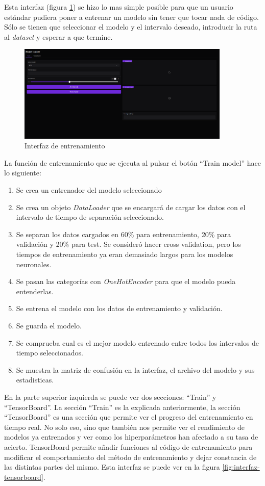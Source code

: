 Esta interfaz (figura \ref{fig:interfaz-train}) se hizo lo mas simple posible para que un usuario estándar pudiera poner a entrenar un modelo sin tener que tocar nada de código. Sólo se tienen que seleccionar el modelo y el intervalo deseado, introducir la ruta al \textit{dataset} y esperar a que termine.
\begin{figure}[H]
    \centering
    \includegraphics[width=0.9\textwidth]{Imagenes/Bitmap/interfaz-train.png}
    \caption{Interfaz de entrenamiento}
    \label{fig:interfaz-train}
\end{figure}


La función de entrenamiento que se ejecuta al pulsar el botón ``Train model'' hace lo siguiente:
\begin{enumerate}
    \item Se crea un entrenador del modelo seleccionado
    \item Se crea un objeto \textit{DataLoader} que se encargará de cargar los datos con el intervalo de tiempo de separación seleccionado.
    \item Se separan los datos cargados en 60\% para entrenamiento, 20\% para validación y 20\% para test. Se consideró hacer cross validation, pero los tiempos de entrenamiento ya eran demasiado largos para los modelos neuronales.
    \item Se pasan las categorías con \textit{OneHotEncoder} para que el modelo pueda entenderlas.
    \item Se entrena el modelo con los datos de entrenamiento y validación.
    \item Se guarda el modelo.
    \item Se comprueba cual es el mejor modelo entrenado entre todos los intervalos de tiempo seleccionados.
    \item Se muestra la matriz de confusión en la interfaz, el archivo del modelo y sus estadisticas.
\end{enumerate}

En la parte superior izquierda se puede ver dos secciones: ``Train'' y ``TensorBoard''. La sección ``Train'' es la explicada anteriormente, la sección ``TensorBoard'' es una sección que permite ver el progreso del entrenamiento en tiempo real. No solo eso, sino que también nos permite ver el rendimiento de modelos ya entrenados y ver como los hiperparámetros han afectado a su tasa de acierto. TensorBoard permite añadir funciones al código de entrenamiento para modificar el comportamiento del método de entrenamiento y dejar constancia de las distintas partes del mismo. Esta interfaz se puede ver en la figura \ref{fig:interfaz-tensorboard}.

